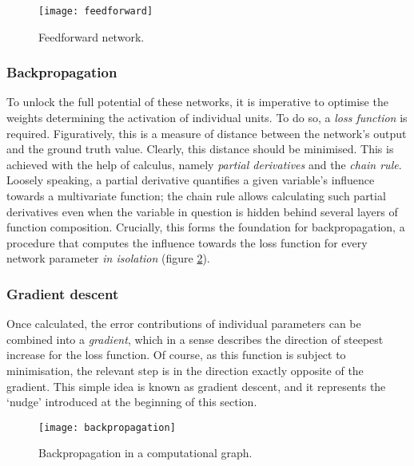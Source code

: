 \documentclass[../../report.tex]{subfiles}
\begin{document}
\begin{figure}
  \centering
  \texttt{[image: feedforward]}
  \caption{Feedforward network.}
  \label{fig:feedforward}
\end{figure}

\subsubsection{Backpropagation}
To unlock the full potential of these networks, it is imperative to optimise the
weights determining the activation of individual units. To do so, a \emph{loss
function} is required. Figuratively, this is a measure of distance between the
network's output and the ground truth value. Clearly, this distance should be
minimised. This is achieved with the help of calculus, namely \emph{partial
derivatives} and the \emph{chain rule}. Loosely speaking, a partial derivative
quantifies a given variable's influence towards a multivariate function; the
chain rule allows calculating such partial derivatives even when the variable in
question is hidden behind several layers of function composition. Crucially,
this forms the foundation for backpropagation, a procedure that computes the
influence towards the loss function for every network parameter \emph{in
isolation} (figure \ref{fig:backpropagation}).

\subsubsection{Gradient descent}
Once calculated, the error contributions of individual parameters can be
combined into a \emph{gradient}, which in a sense describes the direction of
steepest increase\footnotemark{} for the loss function. Of course, as this
function is subject to minimisation, the relevant step is in the direction
exactly opposite of the gradient. This simple idea is known as gradient descent,
and it represents the `nudge' introduced at the beginning of this section.


\begin{figure}
  \centering
  \texttt{[image: backpropagation]}
  \caption{Backpropagation in a computational graph. \cite{Olah2015Backprop}}
  \label{fig:backpropagation}
\end{figure}
\end{document}
